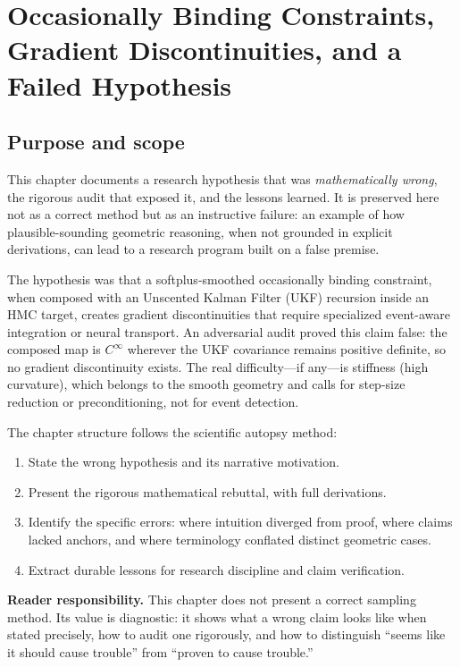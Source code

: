 \chapter{Occasionally Binding Constraints, Gradient Discontinuities, and a Failed Hypothesis}
\label{ch:bf-obc-discontinuous-gradient}

\section{Purpose and scope}

This chapter documents a research hypothesis that was \emph{mathematically wrong}, the rigorous audit that exposed it, and the lessons learned. It is preserved here not as a correct method but as an instructive failure: an example of how plausible-sounding geometric reasoning, when not grounded in explicit derivations, can lead to a research program built on a false premise.

The hypothesis was that a softplus-smoothed occasionally binding constraint, when composed with an Unscented Kalman Filter (UKF) recursion inside an HMC target, creates gradient discontinuities that require specialized event-aware integration or neural transport. An adversarial audit proved this claim false: the composed map is $C^\infty$ wherever the UKF covariance remains positive definite, so no gradient discontinuity exists. The real difficulty—if any—is stiffness (high curvature), which belongs to the smooth geometry and calls for step-size reduction or preconditioning, not for event detection.

The chapter structure follows the scientific autopsy method:
\begin{enumerate}
\item State the wrong hypothesis and its narrative motivation.
\item Present the rigorous mathematical rebuttal, with full derivations.
\item Identify the specific errors: where intuition diverged from proof, where claims lacked anchors, and where terminology conflated distinct geometric cases.
\item Extract durable lessons for research discipline and claim verification.
\end{enumerate}

\textbf{Reader responsibility.} This chapter does not present a correct sampling method. Its value is diagnostic: it shows what a wrong claim looks like when stated precisely, how to audit one rigorously, and how to distinguish ``seems like it should cause trouble'' from ``proven to cause trouble.''

